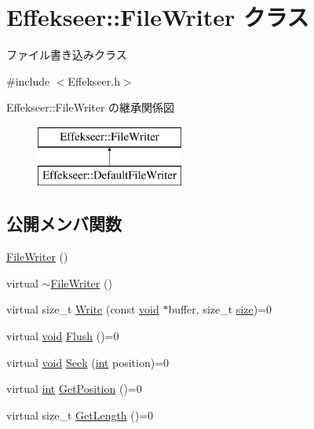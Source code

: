\hypertarget{class_effekseer_1_1_file_writer}{}\section{Effekseer\+:\+:File\+Writer クラス}
\label{class_effekseer_1_1_file_writer}


ファイル書き込みクラス  




{\ttfamily \#include $<$Effekseer.\+h$>$}

Effekseer\+:\+:File\+Writer の継承関係図\begin{figure}[H]
\begin{center}
\leavevmode
\includegraphics[height=2.000000cm]{class_effekseer_1_1_file_writer}
\end{center}
\end{figure}
\subsection*{公開メンバ関数}
\begin{DoxyCompactItemize}
\item 
\mbox{\hyperlink{class_effekseer_1_1_file_writer_a7f8a88996d7bffbff900787feebd81dd}{File\+Writer}} ()
\item 
virtual \mbox{\hyperlink{class_effekseer_1_1_file_writer_aa4959a2a84ec4754b615d6b665d71988}{$\sim$\+File\+Writer}} ()
\item 
virtual size\+\_\+t \mbox{\hyperlink{class_effekseer_1_1_file_writer_a7bdd5dc4f70f8e83c03de7e96af5dc27}{Write}} (const \mbox{\hyperlink{namespace_effekseer_ab34c4088e512200cf4c2716f168deb56}{void}} $\ast$buffer, size\+\_\+t \mbox{\hyperlink{namespace_effekseer_a73c68f3d33539d30844b9d1e058077f7}{size}})=0
\item 
virtual \mbox{\hyperlink{namespace_effekseer_ab34c4088e512200cf4c2716f168deb56}{void}} \mbox{\hyperlink{class_effekseer_1_1_file_writer_a319bba7ef4e98e98a5248accbee98df1}{Flush}} ()=0
\item 
virtual \mbox{\hyperlink{namespace_effekseer_ab34c4088e512200cf4c2716f168deb56}{void}} \mbox{\hyperlink{class_effekseer_1_1_file_writer_a9057c57df33d5112bc0d2c4e3e0c542d}{Seek}} (\mbox{\hyperlink{namespace_effekseer_ace0abf7c2e6947e519ebe8b54cbcc30a}{int}} position)=0
\item 
virtual \mbox{\hyperlink{namespace_effekseer_ace0abf7c2e6947e519ebe8b54cbcc30a}{int}} \mbox{\hyperlink{class_effekseer_1_1_file_writer_a656bbee191e65ccc63791d5c41c6e853}{Get\+Position}} ()=0
\item 
virtual size\+\_\+t \mbox{\hyperlink{class_effekseer_1_1_file_writer_a6baf95dec7700d2c7a5e71c6c4f76724}{Get\+Length}} ()=0
\end{DoxyCompactItemize}


